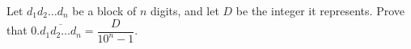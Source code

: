 Let $d_1d_2\dots d_n$ be a block of $n$ digits, and let $D$ be the integer it represents. Prove that $0.\overline{d_1d_2\dots d_n}=\dfrac D{10^n-1}$.
